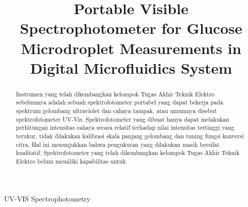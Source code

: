 \documentclass[conference]{IEEEtran}
\begin{document}
\makeatletter
\newcommand{\newlineauthors}{%
  \end{@IEEEauthorhalign}\hfill\mbox{}\par
  \mbox{}\hfill\begin{@IEEEauthorhalign}
}
\makeatother

\title{Portable Visible Spectrophotometer for Glucose Microdroplet Measurements in Digital Microfluidics System}

\author{
}

\maketitle

\begin{abstract}
    Instrumen yang telah dikembangkan kelompok Tugas Akhir Teknik Elektro sebelumnya adalah sebuah spektrofotometer portabel yang dapat bekerja pada spektrum gelombang ultraviolet dan cahaya tampak, atau umumnya disebut spektrofotometer UV-Vis. Spektrofotometer yang dibuat hanya dapat melakukan perhitungan intensitas cahaya secara relatif terhadap nilai intensitas tertinggi yang terukur, tidak dilakukan kalibrasi skala panjang gelombang dan tuning fungsi konversi citra. Hal ini menunjukkan bahwa pengukuran yang dilakukan masih bersifat kualitatif. Spektrofotometer yang telah dikembangkan kelompok Tugas Akhir Teknik Elektro belum memiliki kapabilitas untuk 
\end{abstract}

\begin{IEEEkeywords}
    UV-VIS Spectrophotometry
\end{IEEEkeywords}
\end{document}
